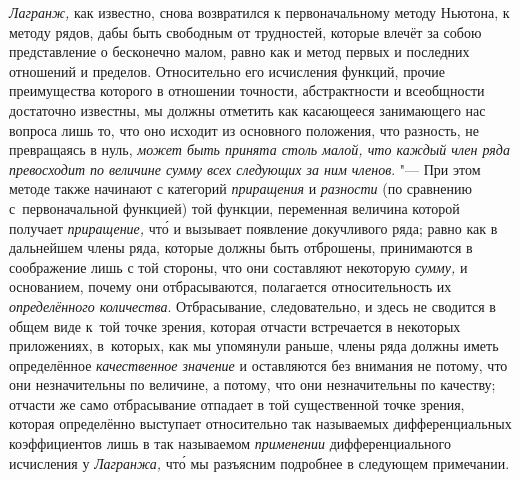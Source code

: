 {\em Лагранж,} как известно, снова возвратился к первоначальному методу
Ньютона, к методу рядов, дабы быть свободным от трудностей, которые влечёт за
собою представление о бесконечно малом, равно как и метод первых и последних
отношений и пределов. Относительно его исчисления функций, прочие преимущества
которого в отношении точности, абстрактности и всеобщности достаточно известны,
мы должны отметить как касающееся занимающего нас вопроса лишь то, что оно
исходит из основного положения, что разность, не превращаясь в нуль,
{\em может быть принята столь малой, что каждый член ряда превосходит по
величине сумму всех следующих за ним членов}. "--- При этом методе также
начинают с категорий {\em приращения} и {\em разности} (по сравнению
с~первоначальной функцией) той функции, переменная величина которой получает
{\em приращение,} чт\'{о} и вызывает появление докучливого ряда; равно как в
дальнейшем члены ряда, которые должны быть отброшены, принимаются в соображение
лишь с той стороны, что они составляют некоторую {\em сумму,} и основанием,
почему они отбрасываются, полагается относительность их {\em определённого
количества}. Отбрасывание, следовательно, и здесь не сводится в общем виде
к~той точке зрения, которая отчасти встречается в некоторых приложениях,
в~которых, как мы упомянули раньше, члены ряда должны иметь определённое
{\em качественное значение} и оставляются без внимания не потому, что они
незначительны по величине, а потому, что они незначительны по качеству;
отчасти же само отбрасывание отпадает в той существенной точке зрения,
которая определённо выступает относительно так называемых дифференциальных
коэффициентов лишь в так называемом {\em применении} дифференциального
исчисления у {\em Лагранжа,} чт\'{о} мы разъясним подробнее в следующем примечании.


